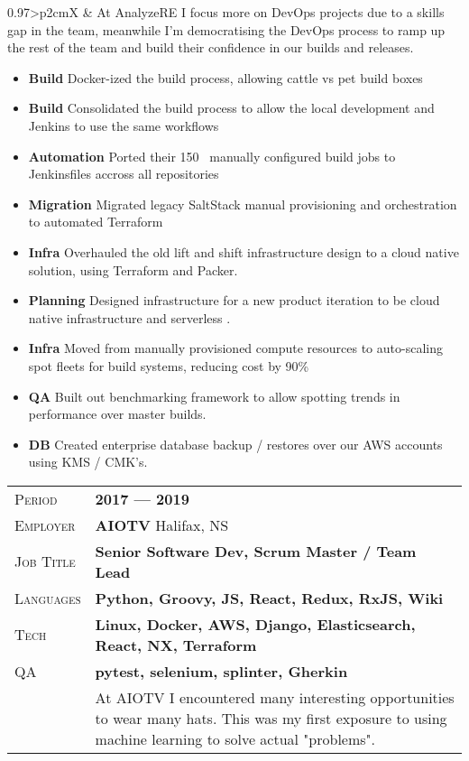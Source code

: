 \documentclass[a4paper, oneside, final]{scrartcl}
\newcommand{\gray}{\rowcolor[gray]{.90}}
\begin{document}
\begin{center}
\begin{tabularx}{0.97\linewidth}{>{\raggedleft\scshape}p{2cm}X}
& At AnalyzeRE I focus more on DevOps projects due to a skills gap in the team, meanwhile I'm democratising the DevOps process to ramp up the rest of the team and build their confidence in our builds and releases.

\begin{itemize}
\item \textbf {Build} Docker-ized the build process, allowing cattle vs pet build boxes
\item \textbf {Build} Consolidated the build process to allow the local development and Jenkins to use the same workflows
\item \textbf {Automation} Ported their 150~ manually configured build jobs to Jenkinsfiles accross all repositories
\item \textbf {Migration} Migrated legacy SaltStack manual provisioning and orchestration to automated Terraform
\item \textbf {Infra} Overhauled the old lift and shift infrastructure design to a cloud native solution, using Terraform and Packer.
\item \textbf {Planning} Designed infrastructure for a new product iteration to be cloud native infrastructure and serverless .
\item \textbf {Infra} Moved from  manually provisioned compute resources to auto-scaling spot fleets for build systems, reducing cost by 90\%
\item \textbf {QA} Built out benchmarking framework to allow spotting trends in performance over master builds.
\item \textbf {DB} Created enterprise database backup / restores over our AWS accounts using KMS / CMK's.

\end{itemize}

\end{tabularx}

\begin{tabularx}{0.97\linewidth}{>{\raggedleft\scshape}p{2cm}X}
\gray Period & \textbf{2017 --- 2019}\\
\gray Employer & \textbf{AIOTV} \hfill Halifax, NS\\
\gray Job Title & \textbf{Senior Software Dev, Scrum Master / Team Lead}\\
\gray Languages & \textbf{Python, Groovy, JS, React, Redux, RxJS, Wiki}\\
\gray Tech & \textbf{Linux, Docker, AWS, Django, Elasticsearch, React, NX, Terraform}\\
\gray QA& \textbf{pytest, selenium, splinter, Gherkin}\\
& At AIOTV I encountered many interesting opportunities to wear many hats. This was my first exposure to using machine learning to solve actual "problems".


\end{tabularx}
\end{center}
\end{document}
